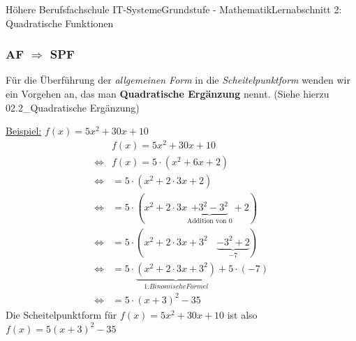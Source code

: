 \documentclass[11pt,twocolumn,oneside,openany,headings=optiontotoc,11pt,numbers=noenddot]{article}
\begin{document}
\begin{worksheet}{Höhere Berufsfachschule IT-Systeme}{Grundstufe - Mathematik}{Lernabschnitt 2: Quadratische Funktionen}
		\subsubsection*{AF \(\Rightarrow\) SPF}
		Für die Überführung der \textit{allgemeinen Form} in die \textit{Scheitelpunktform} wenden wir ein Vorgehen an, das man \textbf{Quadratische Ergänzung} nennt. \tiny{(Siehe hierzu 02.2\_Quadratische Ergänzung)}\normalsize\\
		\par\noindent
		\underline{Beispiel:} \(f(x) = 5x^2+30x +10\)
		\begin{align*}
			& f(x) = 5x^2+30x+10\\
			\Leftrightarrow & f(x) = 5\cdot(x^2+6x+2)\\
			\Leftrightarrow & = 5\cdot(x^2+2\cdot{}3x+2)\\
			\Leftrightarrow & = 5\cdot(x^2+2\cdot{}3x \underbrace{+ 3^2 - 3^2}_{\text{Addition von }0} +2)\\
			\Leftrightarrow & = 5\cdot(x^2 +2\cdot{}3x + 3^2\ \ \ \ \underbrace{- 3^2 +2}_{-7})\\
			\Leftrightarrow & = 5\cdot\underbrace{(x^2 + 2\cdot{}3x + 3^2)}_{1. Binomische Formel} +5\cdot(-7)\\
			\Leftrightarrow & = 5\cdot(x+3)^2 -35
		\end{align*}
		Die Scheitelpunktform für \(f(x) = 5x^2+30x+10\) ist also \colorbox{green!10}{\(f(x) = 5(x+3)^2 - 35\)}
	\end{worksheet}
\end{document}
